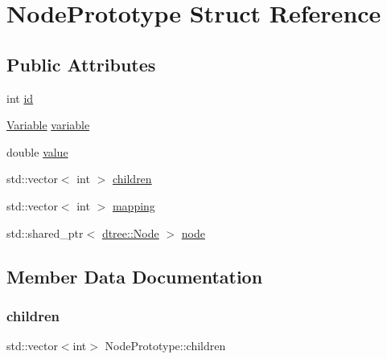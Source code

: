 \hypertarget{struct_node_prototype}{}\section{Node\+Prototype Struct Reference}
\label{struct_node_prototype}
\subsection*{Public Attributes}
\begin{DoxyCompactItemize}
\item 
int \mbox{\hyperlink{struct_node_prototype_af7f4f678a9820e74ff2eef5e497fbf02}{id}}
\item 
\mbox{\hyperlink{namespacedtree_a79fe30831a14df904319f9e783b3189b}{Variable}} \mbox{\hyperlink{struct_node_prototype_ae237d0ec6cb92e07b948b1f019c1d851}{variable}}
\item 
double \mbox{\hyperlink{struct_node_prototype_a5c9384aee93f7c59d57eb796bd6c0352}{value}}
\item 
std\+::vector$<$ int $>$ \mbox{\hyperlink{struct_node_prototype_aef5edf11dfcae77bbbfa45f3e82f2d58}{children}}
\item 
std\+::vector$<$ int $>$ \mbox{\hyperlink{struct_node_prototype_a6bebc845e90ddde2ccba116a984a0b46}{mapping}}
\item 
std\+::shared\+\_\+ptr$<$ \mbox{\hyperlink{classdtree_1_1_node}{dtree\+::\+Node}} $>$ \mbox{\hyperlink{struct_node_prototype_a4de54ebebfee803c7cb05a63c3cde610}{node}}
\end{DoxyCompactItemize}


\subsection{Member Data Documentation}
\mbox{\label{struct_node_prototype_aef5edf11dfcae77bbbfa45f3e82f2d58}} 
\subsubsection{\texorpdfstring{children}{children}}
{\footnotesize\ttfamily std\+::vector$<$int$>$ Node\+Prototype\+::children}

\mbox{\label{struct_node_prototype_af7f4f678a9820e74ff2eef5e497fbf02}} 
